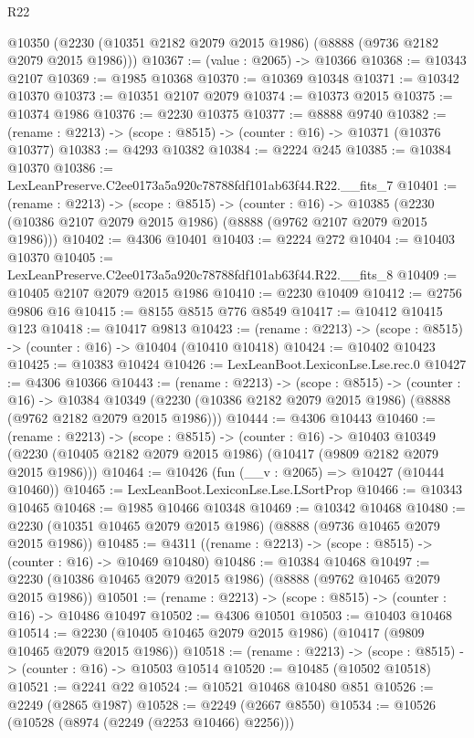 \begin{lexlean}{R22}
\begin{coremodule}
  @10350 (@2230 (@10351 @2182 @2079 @2015 @1986) (@8888 (@9736 @2182 @2079 @2015 @1986)))
@10367 := (value : @2065) -> @10366
@10368 := @10343 @2107
@10369 := @1985 @10368
@10370 := @10369 @10348
@10371 := @10342 @10370
@10373 := @10351 @2107 @2079
@10374 := @10373 @2015
@10375 := @10374 @1986
@10376 := @2230 @10375
@10377 := @8888 @9740
@10382 := (rename : @2213) -> (scope : @8515) -> (counter : @16) -> @10371 (@10376 @10377)
@10383 := @4293 @10382
@10384 := @2224 @245
@10385 := @10384 @10370
@10386 := LexLeanPreserve.C2ee0173a5a920c78788fdf101ab63f44.R22.__fits_7
@10401 := (rename : @2213) ->
  (scope : @8515) ->
  (counter : @16) ->
  @10385 (@2230 (@10386 @2107 @2079 @2015 @1986) (@8888 (@9762 @2107 @2079 @2015 @1986)))
@10402 := @4306 @10401
@10403 := @2224 @272
@10404 := @10403 @10370
@10405 := LexLeanPreserve.C2ee0173a5a920c78788fdf101ab63f44.R22.__fits_8
@10409 := @10405 @2107 @2079 @2015 @1986
@10410 := @2230 @10409
@10412 := @2756 @9806 @16
@10415 := @8155 @8515 @776 @8549
@10417 := @10412 @10415 @123
@10418 := @10417 @9813
@10423 := (rename : @2213) -> (scope : @8515) -> (counter : @16) -> @10404 (@10410 @10418)
@10424 := @10402 @10423
@10425 := @10383 @10424
@10426 := LexLeanBoot.LexiconLse.Lse.rec.{0}
@10427 := @4306 @10366
@10443 := (rename : @2213) ->
  (scope : @8515) ->
  (counter : @16) ->
  @10384 @10349 (@2230 (@10386 @2182 @2079 @2015 @1986) (@8888 (@9762 @2182 @2079 @2015 @1986)))
@10444 := @4306 @10443
@10460 := (rename : @2213) ->
  (scope : @8515) ->
  (counter : @16) ->
  @10403 @10349 (@2230 (@10405 @2182 @2079 @2015 @1986) (@10417 (@9809 @2182 @2079 @2015 @1986)))
@10464 := @10426 (fun (__v : @2065) => @10427 (@10444 @10460))
@10465 := LexLeanBoot.LexiconLse.Lse.LSortProp
@10466 := @10343 @10465
@10468 := @1985 @10466 @10348
@10469 := @10342 @10468
@10480 := @2230 (@10351 @10465 @2079 @2015 @1986) (@8888 (@9736 @10465 @2079 @2015 @1986))
@10485 := @4311 ((rename : @2213) -> (scope : @8515) -> (counter : @16) -> @10469 @10480)
@10486 := @10384 @10468
@10497 := @2230 (@10386 @10465 @2079 @2015 @1986) (@8888 (@9762 @10465 @2079 @2015 @1986))
@10501 := (rename : @2213) -> (scope : @8515) -> (counter : @16) -> @10486 @10497
@10502 := @4306 @10501
@10503 := @10403 @10468
@10514 := @2230 (@10405 @10465 @2079 @2015 @1986) (@10417 (@9809 @10465 @2079 @2015 @1986))
@10518 := (rename : @2213) -> (scope : @8515) -> (counter : @16) -> @10503 @10514
@10520 := @10485 (@10502 @10518)
@10521 := @2241 @22
@10524 := @10521 @10468 @10480 @851
@10526 := @2249 (@2865 @1987)
@10528 := @2249 (@2667 @8550)
@10534 := @10526 (@10528 (@8974 (@2249 (@2253 @10466) @2256)))

\end{coremodule}
\end{lexlean}
